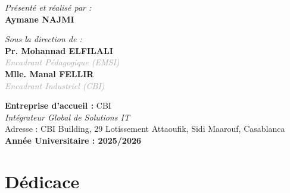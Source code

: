\documentclass[12pt, a4paper]{report}
\newcommand{\MonNom}{Aymane NAJMI}
\newcommand{\EncadrantEcole}{Pr. Mohannad ELFILALI}
\newcommand{\EncadrantEntr}{Mlle. Manal FELLIR}
\newcommand{\Entreprise}{CBI}
\begin{document}
\begin{titlepage}
\begin{center}
        \begin{minipage}[t]{0.45\textwidth}
            \begin{flushleft} \large
                \textit{Présenté et réalisé par :}\\[0.3cm]
                {\Large \textbf{\MonNom}}
            \end{flushleft}
        \end{minipage}
        \hfill
        \begin{minipage}[t]{0.5\textwidth}
            \begin{flushright} \large
                \textit{Sous la direction de :}\\[0.3cm]
                \textbf{\EncadrantEcole} \\
                \small{\textcolor{darkgray}{\textit{Encadrant Pédagogique (EMSI)}}}\\[0.4cm]
                \large\textbf{\EncadrantEntr} \\
                \small{\textcolor{darkgray}{\textit{Encadrant Industriel (CBI)}}}
            \end{flushright}
        \end{minipage}
        
        \vfill
        
        \textbf{Entreprise d'accueil :} \Entreprise \\
        \textit{Intégrateur Global de Solutions IT} \\
        \small{Adresse : CBI Building, 29 Lotissement Attaoufik, Sidi Maarouf, Casablanca}\\[0.8cm]
        
        {\large \textbf{Année Universitaire : 2025/2026}}
        
    \end{center}
\end{titlepage}


\chapter*{Dédicace}
\end{document}
